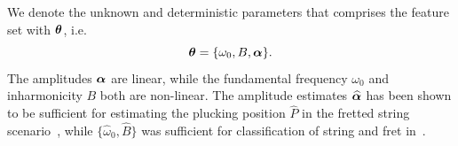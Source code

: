 We denote the unknown and deterministic parameters that comprises the feature set with $\text{\boldmath$\theta$}$, i.e.
\begin{equation}\label{eq:theta_parameters}
  \text{\boldmath$\theta$} = \{\omega_0, B, \text{\boldmath$\alpha$}\}.
\end{equation}
The amplitudes $\text{\boldmath$\alpha$}$ are linear, while the fundamental frequency $\omega_0$ and inharmonicity $B$ both are non-linear. 
The amplitude estimates $\text{\boldmath${\widehat\alpha}$}$ has been shown to be sufficient for estimating the plucking position $\widehat{P}$ in the fretted string scenario~\cite{hjerrild::icassp19}, while $\{\widehat\omega_0, \widehat B \} $ was sufficient for classification of string and fret in~\cite{barbancho:inharmonicity_tablature,michelson2018_aes}.